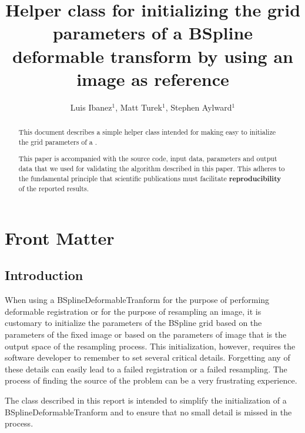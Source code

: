 \documentclass{InsightArticle}
\title{Helper class for initializing the grid parameters of a BSpline
deformable transform by using an image as reference}
\author{Luis Ibanez$^{1}$, Matt Turek$^{1}$, Stephen Aylward$^{1}$}
\begin{document}
\ifpdf
\else
\fi


\maketitle


\ifhtml
\chapter*{Front Matter\label{front}}
\fi


\begin{abstract}
\noindent
This document describes a simple helper class intended for making easy to
initialize the grid parameters of a .

This paper is accompanied with the source code, input data, parameters and
output data that we used for validating the algorithm described in this paper.
This adheres to the fundamental principle that scientific publications must
facilitate \textbf{reproducibility} of the reported results.
\end{abstract}

\tableofcontents

\section{Introduction}

When using a BSplineDeformableTranform for the purpose of performing deformable
registration or for the purpose of resampling an image, it is customary to
initialize the parameters of the BSpline grid based on the parameters of the
fixed image or based on the parameters of image that is the output space of the
resampling process. This initialization, however, requires the software
developer to remember to set several critical details. Forgetting any of these
details can easily lead to a failed registration or a failed resampling. The
process of finding the source of the problem can be a very frustrating
experience.

The class described in this report is intended to simplify the initialization
of a BSplineDeformableTranform and to ensure that no small detail is missed in
the process.
\end{document}
